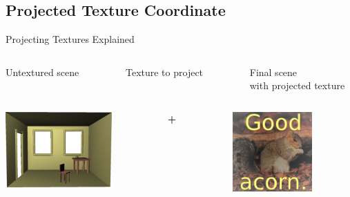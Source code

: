 \documentclass{beamer}
\begin{document}
\subsection{Projected Texture Coordinate}

\begin{frame}[t]{Projecting Textures Explained}

  \vspace{-0.3in}

  \begin{columns}[b]
    \begin{column}{1.6in} \begin{center} Untextured scene \end{center} \end{column}
    \begin{column}{0.1in} \end{column}
    \begin{column}{1.3in} \begin{center} Texture to project \end{center} \end{column}
    \begin{column}{0.1in} \end{column}
    \begin{column}{1.6in} \begin{center} Final scene\\ with projected texture \end{center} \end{column}
  \end{columns}
  \begin{columns}[c]
    \begin{column}{1.6in}
      \includegraphics[width=1.6in]{projector_room_no}
    \end{column}
    \begin{column}{0.1in}
      \Large{\textbf{+}}
    \end{column}
    \begin{column}{1.3in}
      \includegraphics[width=1.2in]{test_texture}

\end{column}
\end{columns}
\end{frame}
\end{document}
